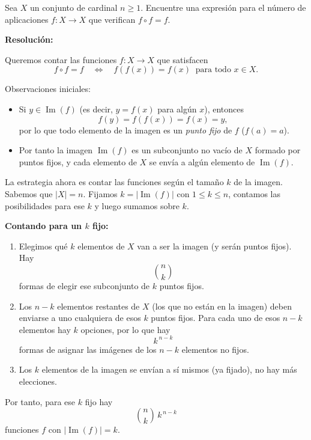 \documentclass[a4paper,12pt]{article}
\begin{document}
\begin{ejercicio}[title=Ejercicio 22 (⋆)]
Sea $X$ un conjunto de cardinal $n \ge 1$. Encuentre una expresión para el número de aplicaciones $f : X \to X$ que verifican $f \circ f = f$.

\tcblower
\textbf{Resolución:}

Queremos contar las funciones \(f:X\to X\) que satisfacen
\[
f\circ f=f \quad\Longleftrightarrow\quad f(f(x))=f(x)\ \text{ para todo }x\in X.
\]

Observaciones iniciales:
\begin{itemize}
  \item Si \(y\in\operatorname{Im}(f)\) (es decir, \(y=f(x)\) para algún \(x\)), entonces
  \[
  f(y)=f(f(x))=f(x)=y,
  \]
  por lo que todo elemento de la imagen es un \emph{punto fijo} de \(f\) ($f(a) = a$).
  \item Por tanto la imagen \(\operatorname{Im}(f)\) es un subconjunto no vacío de \(X\) formado por puntos fijos, y cada elemento de \(X\) se envía a algún elemento de \(\operatorname{Im}(f)\).
\end{itemize}

La estrategia ahora es contar las funciones según el tamaño \(k\) de la imagen. Sabemos que $|X| = n$. Fijamos \(k=|\operatorname{Im}(f)|\) con \(1\le k\le n\), contamos las posibilidades para ese \(k\) y luego sumamos sobre \(k\).

\bigskip

\textbf{Contando para un \(k\) fijo:}
\begin{enumerate}
  \item Elegimos qué \(k\) elementos de \(X\) van a ser la imagen (y serán puntos fijos). Hay
  \[
  \binom{n}{k}
  \]
  formas de elegir ese subconjunto de \(k\) puntos fijos.
  \item Los \(n-k\) elementos restantes de \(X\) (los que no están en la imagen) deben enviarse a uno cualquiera de esos \(k\) puntos fijos. Para cada uno de esos \(n-k\) elementos hay \(k\) opciones, por lo que hay
  \[
  k^{\,n-k}
  \]
  formas de asignar las imágenes de los \(n-k\) elementos no fijos.
  \item Los \(k\) elementos de la imagen se envían a sí mismos (ya fijado), no hay más elecciones.
\end{enumerate}

Por tanto, para ese \(k\) fijo hay
\[
\binom{n}{k}\,k^{\,n-k}
\]
funciones \(f\) con \(|\operatorname{Im}(f)|=k\).

\end{ejercicio}
\end{document}
